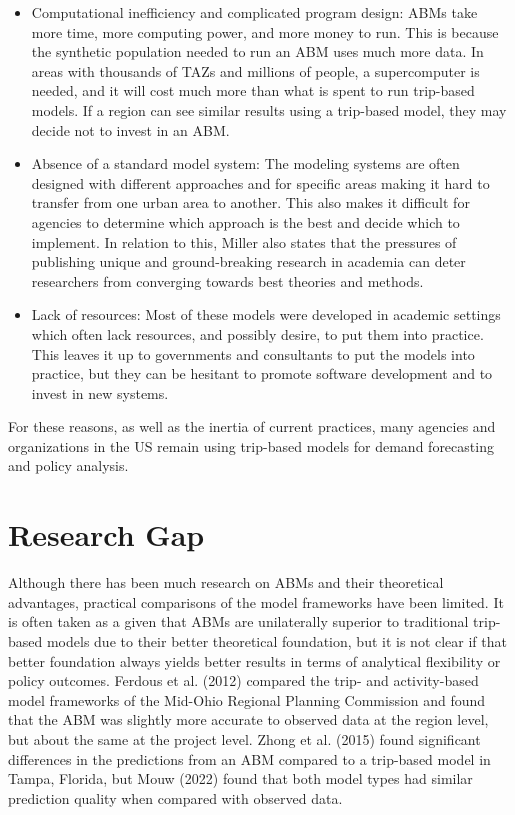 \documentclass[fancy, twoside, mastersfancy, ms]{byuthesis}
\begin{document}
\begin{itemize}
\item
  Computational inefficiency and complicated program design: ABMs take
  more time, more computing power, and more money to run. This is
  because the synthetic population needed to run an ABM uses much more
  data. In areas with thousands of TAZs and millions of people, a
  supercomputer is needed, and it will cost much more than what is spent
  to run trip-based models. If a region can see similar results using a
  trip-based model, they may decide not to invest in an ABM.
\item
  Absence of a standard model system: The modeling systems are often
  designed with different approaches and for specific areas making it
  hard to transfer from one urban area to another. This also makes it
  difficult for agencies to determine which approach is the best and
  decide which to implement. In relation to this, Miller also states
  that the pressures of publishing unique and ground-breaking research
  in academia can deter researchers from converging towards best
  theories and methods.
\item
  Lack of resources: Most of these models were developed in academic
  settings which often lack resources, and possibly desire, to put them
  into practice. This leaves it up to governments and consultants to put
  the models into practice, but they can be hesitant to promote software
  development and to invest in new systems.
\end{itemize}

For these reasons, as well as the inertia of current practices, many
agencies and organizations in the US remain using trip-based models for
demand forecasting and policy analysis.

\section{Research Gap}\label{sec-literature-research-gap}

Although there has been much research on ABMs and their theoretical
advantages, practical comparisons of the model frameworks have been
limited. It is often taken as a given that ABMs are unilaterally
superior to traditional trip-based models due to their better
theoretical foundation, but it is not clear if that better foundation
always yields better results in terms of analytical flexibility or
policy outcomes. Ferdous et al. (2012) compared the trip- and
activity-based model frameworks of the Mid-Ohio Regional Planning
Commission and found that the ABM was slightly more accurate to observed
data at the region level, but about the same at the project level. Zhong
et al. (2015) found significant differences in the predictions from an
ABM compared to a trip-based model in Tampa, Florida, but Mouw (2022)
found that both model types had similar prediction quality when compared
with observed data.
\end{document}
